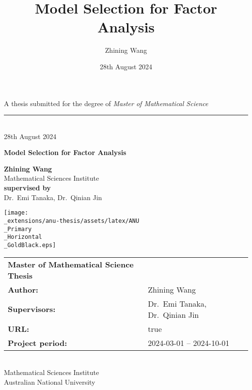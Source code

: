 \documentclass[
  a4paper,
  oneside,
  openany,
  12pt,
  onecolumn,
  twoside]{book}
\title{Model Selection for Factor Analysis}
\author{Zhining Wang}
\date{28th August 2024}
\theoremstyle{plain}
\theoremstyle{remark}
\begin{document}
  \begin{frontmatter}
  \begin{titlepage}

  \begin{titlepage}
    \begin{flushright}%
      \vspace{50mm}
      {\small A thesis submitted for the degree of {\it Master of
  Mathematical Science}}
      \rule[1ex]{\textwidth}{1pt}\\
      {\fontsize{9}{0} 28th August 2024}\\
      \vspace{25mm}
      {\fontsize{40}{44}\bfseries Model Selection for Factor
  Analysis\par}
        \vspace{12mm}
        \vfill
      {\fontsize{20}{0}\bfseries Zhining Wang}\\
      \vspace{2mm}
      {\fontsize{8}{0} Mathematical Sciences Institute}\\
      \vspace{35mm}
      {\fontsize{10}{0}\bfseries supervised by}\\
      Dr.~Emi Tanaka, Dr.~Qinian Jin
      
      \vspace{2.0cm}
  		\texttt{[image: \\\_extensions/anu-thesis/assets/latex/ANU\\\_Primary\\\_Horizontal\\\_GoldBlack.eps]}\\
   \end{flushright}%

   \clearpage\thispagestyle{empty}
   \normalfont
   \vspace*{\fill}
   \noindent
   \begin{tabular}{lp{10cm}}
     {\bf Master of Mathematical Science Thesis} & \\[2mm]
     {\bf Author:} & Zhining Wang\\[2mm]
     {\bf Supervisors:} & Dr.~Emi Tanaka, Dr.~Qinian Jin\\[2mm]
     {\bf URL:} & true\\[2mm]
     {\bf Project period:} & 2024-03-01 -- 2024-10-01 \\[2mm]
   \end{tabular}\\[2mm]

  \noindent Mathematical Sciences Institute\\
  \noindent Australian National University

  \end{titlepage}
  \setlength{\parindent}{0pt}
  \setlength{\parskip}{1ex plus 0.5ex minus 0.2ex}








  \end{titlepage}
  \end{frontmatter}
\end{document}
